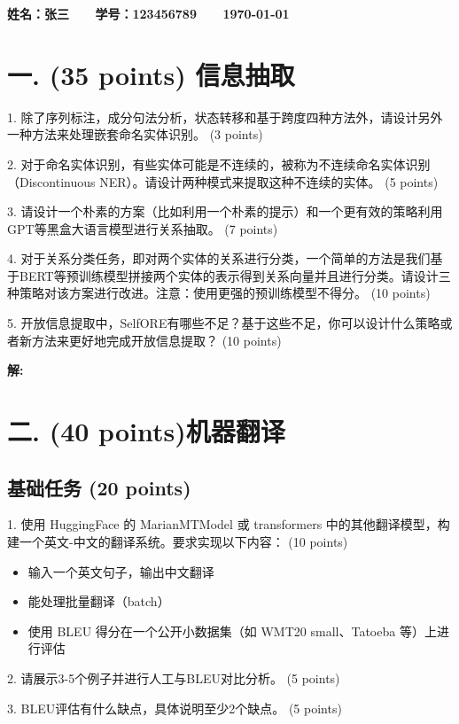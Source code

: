 \documentclass[8pt]{article}
\begin{document}
\textbf{\color{blue} \Large 姓名：张三 \ \ \ 学号：123456789 \ \ \ \today}


\section*{一. (35 points) 信息抽取}
1. 除了序列标注，成分句法分析，状态转移和基于跨度四种方法外，请设计另外一种方法来处理嵌套命名实体识别。 (3 points)

2. 对于命名实体识别，有些实体可能是不连续的，被称为不连续命名实体识别（Discontinuous NER）。请设计两种模式来提取这种不连续的实体。 (5 points)

3. 请设计一个朴素的方案（比如利用一个朴素的提示）和一个更有效的策略利用GPT等黑盒大语言模型进行关系抽取。 (7 points)

4. 对于关系分类任务，即对两个实体的关系进行分类，一个简单的方法是我们基于BERT等预训练模型拼接两个实体的表示得到关系向量并且进行分类。请设计三种策略对该方案进行改进。注意：使用更强的预训练模型不得分。 (10 points)

5. 开放信息提取中，SelfORE有哪些不足？基于这些不足，你可以设计什么策略或者新方法来更好地完成开放信息提取？ (10 points)



\textbf{\large 解:}
\vspace{8em}
\vspace{8em}
\par




\section*{二. (40 points)机器翻译}
\subsection*{基础任务 (20 points)}
1. 使用 HuggingFace 的 MarianMTModel 或 transformers 中的其他翻译模型，构建一个英文-中文的翻译系统。要求实现以下内容： (10 points)
\begin{itemize}
    \item 输入一个英文句子，输出中文翻译
    \item 能处理批量翻译（batch）
    \item 使用 BLEU 得分在一个公开小数据集（如 WMT20 small、Tatoeba 等）上进行评估
\end{itemize}
2. 请展示3-5个例子并进行人工与BLEU对比分析。 (5 points)

3. BLEU评估有什么缺点，具体说明至少2个缺点。 (5 points)
\end{document}
